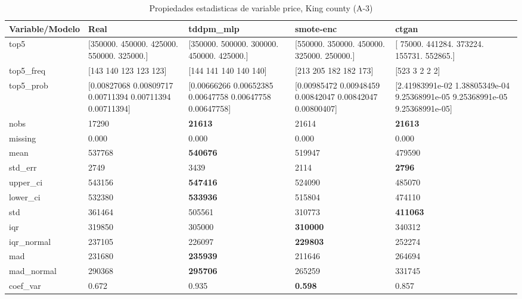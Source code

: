 \begin{table}[H]
\centering
\fontsize{8}{14}\selectfont
\caption{Propiedades  estadisticas de variable price, King county (A-3)}
\label{table-stats-king county-a-3-price}
\begin{tabular}{|l|m{10em}|m{10em}|m{10em}|m{10em}|}
\hline
 \rowcolor[gray]{0.8}
Variable/Modelo & Real & tddpm\_mlp & smote-enc & ctgan \\
\hline top5 & [350000. 450000. 425000. 550000. 325000.] & [350000. 500000. 300000. 450000. 425000.] & [550000. 350000. 450000. 325000. 250000.] & [ 75000. 441284. 373224. 155731. 552865.] \\
\hline top5\_freq & [143 140 123 123 123] & [144 141 140 140 140] & [213 205 182 182 173] & [523   3   2   2   2] \\
\hline top5\_prob & [0.00827068 0.00809717 0.00711394 0.00711394 0.00711394] & [0.00666266 0.00652385 0.00647758 0.00647758 0.00647758] & [0.00985472 0.00948459 0.00842047 0.00842047 0.00800407] & [2.41983991e-02 1.38805349e-04 9.25368991e-05 9.25368991e-05
 9.25368991e-05] \\
\hline nobs & 17290 & \bfseries 21613 & \cellcolor[rgb]{0.9, 0.54, 0.52} 21614 & \bfseries 21613 \\
\hline missing & 0.000 & 0.000 & 0.000 & 0.000 \\
\hline mean & 537768 & \bfseries 540676 & 519947 & \cellcolor[rgb]{0.9, 0.54, 0.52} 479590 \\
\hline std\_err & 2749 & \cellcolor[rgb]{0.9, 0.54, 0.52} 3439 & 2114 & \bfseries 2796 \\
\hline upper\_ci & 543156 & \bfseries 547416 & 524090 & \cellcolor[rgb]{0.9, 0.54, 0.52} 485070 \\
\hline lower\_ci & 532380 & \bfseries 533936 & 515804 & \cellcolor[rgb]{0.9, 0.54, 0.52} 474110 \\
\hline std & 361464 & \cellcolor[rgb]{0.9, 0.54, 0.52} 505561 & 310773 & \bfseries 411063 \\
\hline iqr & 319850 & 305000 & \bfseries 310000 & \cellcolor[rgb]{0.9, 0.54, 0.52} 340312 \\
\hline iqr\_normal & 237105 & 226097 & \bfseries 229803 & \cellcolor[rgb]{0.9, 0.54, 0.52} 252274 \\
\hline mad & 231680 & \bfseries 235939 & 211646 & \cellcolor[rgb]{0.9, 0.54, 0.52} 264694 \\
\hline mad\_normal & 290368 & \bfseries 295706 & 265259 & \cellcolor[rgb]{0.9, 0.54, 0.52} 331745 \\
\hline coef\_var & 0.672 & \cellcolor[rgb]{0.9, 0.54, 0.52} 0.935 & \bfseries 0.598 & 0.857 \\

\end{tabular}
\end{table}
